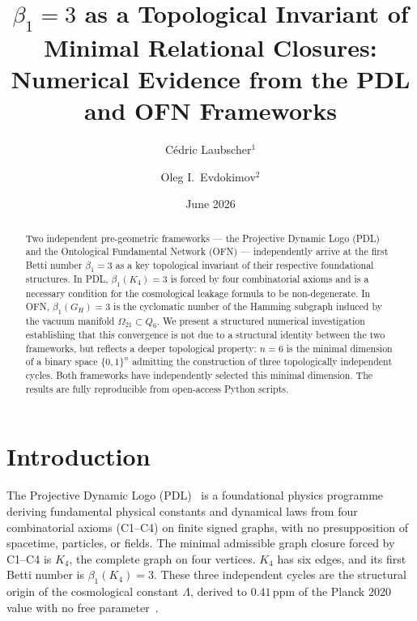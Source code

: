 \documentclass[11pt,a4paper]{article}
\title{$\beta_1 = 3$ as a Topological Invariant of Minimal Relational Closures:\\
Numerical Evidence from the PDL and OFN Frameworks}
\author{
  C\'edric Laubscher$^{1}$ \and Oleg I.\ Evdokimov$^{2}$
}
\date{June 2026}
\begin{document}
\maketitle

\begin{abstract}
Two independent pre-geometric frameworks --- the Projective Dynamic Logo (PDL) and the Ontological Fundamental Network (OFN) --- independently arrive at the first Betti number $\beta_1 = 3$ as a key topological invariant of their respective foundational structures. In PDL, $\beta_1(K_4) = 3$ is forced by four combinatorial axioms and is a necessary condition for the cosmological leakage formula to be non-degenerate. In OFN, $\beta_1(G_H) = 3$ is the cyclomatic number of the Hamming subgraph induced by the vacuum manifold $\Omega_{21} \subset Q_6$. We present a structured numerical investigation establishing that this convergence is not due to a structural identity between the two frameworks, but reflects a deeper topological property: $n = 6$ is the minimal dimension of a binary space $\{0,1\}^n$ admitting the construction of three topologically independent cycles. Both frameworks have independently selected this minimal dimension. The results are fully reproducible from open-access Python scripts.
\end{abstract}

\clearpage

\tableofcontents
\bigskip

\clearpage

\section{Introduction}

The Projective Dynamic Logo (PDL)~\cite{Laubscher_DM_2026} is a foundational physics programme deriving fundamental physical constants and dynamical laws from four combinatorial axioms (C1--C4) on finite signed graphs, with no presupposition of spacetime, particles, or fields. The minimal admissible graph closure forced by C1--C4 is $K_4$, the complete graph on four vertices. $K_4$ has six edges, and its first Betti number is $\beta_1(K_4) = 3$. These three independent cycles are the structural origin of the cosmological constant $\Lambda$, derived to $0.41\,\mathrm{ppm}$ of the Planck 2020 value with no free parameter~\cite{Laubscher_D53_2026}.
\end{document}
